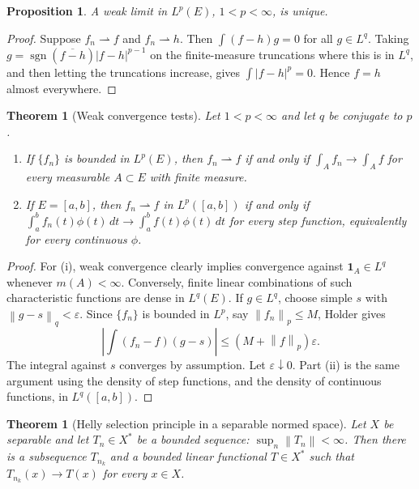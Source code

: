 \documentclass[11pt,openany]{book}
\numberwithin{equation}{chapter}
\theoremstyle{definition}
\theoremstyle{plain}
\newtheorem{theorem}[definition]{Theorem}
\newtheorem{proposition}[definition]{Proposition}
\theoremstyle{remark}
\newcommand{\eps}{\varepsilon}
\newcommand{\1}{\mathbf{1}}
\newcommand{\dd}{\,d}
\newcommand{\abs}[1]{\left\lvert #1\right\rvert}
\newcommand{\norm}[1]{\left\lVert #1\right\rVert}
\newcommand{\sgn}{\operatorname{sgn}}
\begin{document}
\begin{proposition}
A weak limit in \(L^p(E)\), \(1<p<\infty\), is unique.
\end{proposition}

\begin{proof}
Suppose \(f_n\rightharpoonup f\) and \(f_n\rightharpoonup h\).  Then \(\int(f-h)g=0\) for all \(g\in L^q\).  Taking \(g=\sgn(\overline{f-h})\abs{f-h}^{p-1}\) on the finite-measure truncations where this is in \(L^q\), and then letting the truncations increase, gives \(\int\abs{f-h}^p=0\).  Hence \(f=h\) almost everywhere.
\end{proof}

\begin{theorem}[Weak convergence tests]
Let \(1<p<\infty\) and let \(q\) be conjugate to \(p\).
\begin{enumerate}[label=(\roman*)]
    \item If \(\{f_n\}\) is bounded in \(L^p(E)\), then \(f_n\rightharpoonup f\) if and only if \(\int_A f_n\to\int_A f\) for every measurable \(A\subset E\) with finite measure.
    \item If \(E=[a,b]\), then \(f_n\rightharpoonup f\) in \(L^p([a,b])\) if and only if \(\int_a^b f_n(t)\phi(t)\dd t\to\int_a^b f(t)\phi(t)\dd t\) for every step function, equivalently for every continuous \(\phi\).
\end{enumerate}
\end{theorem}

\begin{proof}
For (i), weak convergence clearly implies convergence against \(\1_A\in L^q\) whenever \(m(A)<\infty\).  Conversely, finite linear combinations of such characteristic functions are dense in \(L^q(E)\).  If \(g\in L^q\), choose simple \(s\) with \(\norm{g-s}_q<\eps\).  Since \(\{f_n\}\) is bounded in \(L^p\), say \(\norm{f_n}_p\le M\), Holder gives
\[
    \abs{\int(f_n-f)(g-s)}\le (M+\norm f_p)\eps.
\]
The integral against \(s\) converges by assumption.  Let \(\eps\downarrow0\).  Part (ii) is the same argument using the density of step functions, and the density of continuous functions, in \(L^q([a,b])\).
\end{proof}

\begin{theorem}[Helly selection principle in a separable normed space]
Let \(X\) be separable and let \(T_n\in X^*\) be a bounded sequence: \(\sup_n\norm{T_n}<\infty\).  Then there is a subsequence \(T_{n_k}\) and a bounded linear functional \(T\in X^*\) such that \(T_{n_k}(x)\to T(x)\) for every \(x\in X\).
\end{theorem}
\end{document}

